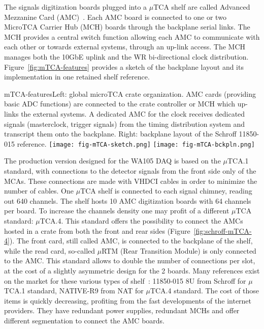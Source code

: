 The signals digitization boards plugged into a $\mu$TCA shelf are called Advanced Mezzanine Card (AMC)~\cite{picmg-2006}. Each AMC board is connected to one or two MicroTCA Carrier Hub (MCH) boards through the backplane serial links. The MCH provides a central switch function allowing each AMC to communicate with each other or towards external systems, through an up-link access. The MCH manages both the 10GbE uplink and the WR bi-directional clock distribution.  
 Figure~\ref{fig:mTCA-features} provides a sketch of the backplane layout and its implementation in one retained shelf reference.

\begin{cdrfigure}{mTCA-features}{\small Left: global microTCA crate organization. AMC cards (providing basic ADC functions) are connected to the crate controller or MCH which up-links the external systems. A dedicated AMC for the clock receives dedicated signals (masterclock, trigger signals) from the timing distribution system and transcript them onto the backplane. Right: backplane layout of the Schroff 11850-015 reference.}
\texttt{[image: fig-mTCA-sketch.png]}\hfill
\texttt{[image: fig-mTCA-bckpln.png]}
\end{cdrfigure}

The production version designed for the WA105 DAQ is based on the $\mu$TCA.1 standard, with connections to the detector signals from the front side only of the MCAs. These connections are made with VHDCI cables in order to minimize the number of cables. One $\mu$TCA shelf is connected to each signal chimney, reading out 640 channels.  The shelf hosts 10 AMC digitization boards with 64 channels per board. To increase the channels density one may profit of a different $\mu$TCA standard: $\mu$TCA.4. This standard offers the possibility to connect the AMCs hosted in a crate from both the front and rear sides (Figure~\ref{fig:schroff-mTCA-4}). The front card, still called AMC, is connected to the backplane of the shelf, while the read card, so-called $\mu$RTM (Rear Transition Module) is only connected to the AMC. This standard allows to double the number of connections per slot, at the cost of a slightly asymmetric design for the 2 boards. Many references exist on the market for these various types of shelf~: 11850-015 8U from Schroff for $\mu$TCA.1 standard, NATIVE-R9 from NAT for $\mu$TCA.4 standard. The cost of those items is quickly decreasing, profiting from the fast developments of the internet providers. They have redundant power supplies, redundant MCHs and offer different segmentation to connect the AMC boards.  


